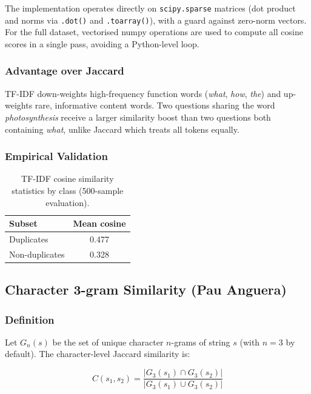 \documentclass[11pt,a4paper]{article}
\begin{document}
The implementation operates directly on \texttt{scipy.sparse} matrices (dot product and norms via \texttt{.dot()} and \texttt{.toarray()}), with a guard against zero-norm vectors. For the full dataset, vectorised numpy operations are used to compute all cosine scores in a single pass, avoiding a Python-level loop.

\subsubsection{Advantage over Jaccard}

TF-IDF down-weights high-frequency function words (\emph{what}, \emph{how}, \emph{the}) and up-weights rare, informative content words. Two questions sharing the word \emph{photosynthesis} receive a larger similarity boost than two questions both containing \emph{what}, unlike Jaccard which treats all tokens equally.

\subsubsection{Empirical Validation}

\begin{table}[h]
\centering
\caption{TF-IDF cosine similarity statistics by class (500-sample evaluation).}
\begin{tabular}{lc}
\toprule
\textbf{Subset} & \textbf{Mean cosine} \\
\midrule
Duplicates     & 0.477 \\
Non-duplicates & 0.328 \\
\bottomrule
\end{tabular}
\end{table}

\subsection{Character 3-gram Similarity \textnormal{(Pau Anguera)}}

\subsubsection{Definition}

Let $G_n(s)$ be the set of unique character $n$-grams of string $s$ (with $n=3$ by default). The character-level Jaccard similarity is:

\[
    C(s_1, s_2) = \frac{|G_3(s_1) \cap G_3(s_2)|}{|G_3(s_1) \cup G_3(s_2)|}
\]
\end{document}
